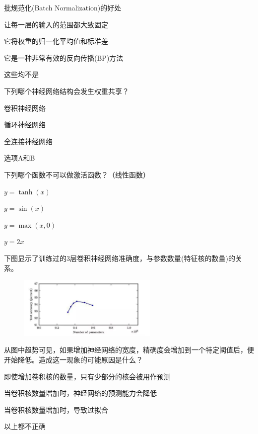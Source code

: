\documentclass{exam-zh}
\begin{document}
\begin{question}
	批规范化(Batch Normalization)的好处 \paren[A]
	\begin{choices}
		\item 让每一层的输入的范围都大致固定
		\item 它将权重的归一化平均值和标准差
		\item 它是一种非常有效的反向传播(BP)方法
		\item 这些均不是
	\end{choices}
\end{question}

\begin{question}
	下列哪个神经网络结构会发生权重共享？\paren[D]
	\begin{choices}
		\item 卷积神经网络
		\item 循环神经网络
		\item 全连接神经网络
		\item 选项A和B
	\end{choices}
\end{question}

\begin{question}
	下列哪个函数不可以做激活函数？（线性函数）\paren[D]
	\begin{choices}
		\item $y = \tanh(x)$
		\item $y = \sin(x)$
		\item $y = \max(x, 0)$
		\item $y = 2x$
	\end{choices}
\end{question}

\begin{question}
	下图显示了训练过的3层卷积神经网络准确度，与参数数量(特征核的数量)的关系。
	\begin{figure}[htbp]
		\centering
		\includegraphics[width=0.6\textwidth]{./figure/fig1.png}
	\end{figure}
	从图中趋势可见，如果增加神经网络的宽度，精确度会增加到一个特定阈值后，便开始降低。造成这一现象的可能原因是什么？\paren[C]
	\begin{choices}
		\item 即使增加卷积核的数量，只有少部分的核会被用作预测
		\item 当卷积核数量增加时，神经网络的预测能力会降低
		\item 当卷积核数量增加时，导致过拟合
		\item 以上都不正确
	\end{choices}
\end{question}
\end{document}
